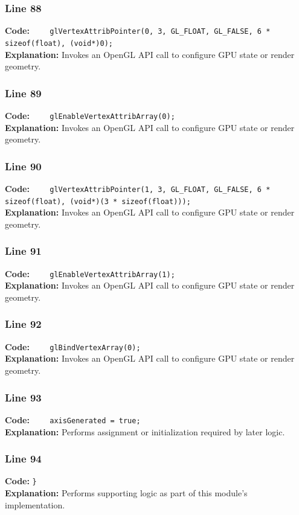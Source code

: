 \documentclass[11pt,a4paper]{article}
\begin{document}
\subsubsection*{Line 88}
\textbf{Code:} \verb|    glVertexAttribPointer(0, 3, GL_FLOAT, GL_FALSE, 6 * sizeof(float), (void*)0);|\\
\textbf{Explanation:} Invokes an OpenGL API call to configure GPU state or render geometry.

\subsubsection*{Line 89}
\textbf{Code:} \verb|    glEnableVertexAttribArray(0);|\\
\textbf{Explanation:} Invokes an OpenGL API call to configure GPU state or render geometry.

\subsubsection*{Line 90}
\textbf{Code:} \verb|    glVertexAttribPointer(1, 3, GL_FLOAT, GL_FALSE, 6 * sizeof(float), (void*)(3 * sizeof(float)));|\\
\textbf{Explanation:} Invokes an OpenGL API call to configure GPU state or render geometry.

\subsubsection*{Line 91}
\textbf{Code:} \verb|    glEnableVertexAttribArray(1);|\\
\textbf{Explanation:} Invokes an OpenGL API call to configure GPU state or render geometry.

\subsubsection*{Line 92}
\textbf{Code:} \verb|    glBindVertexArray(0);|\\
\textbf{Explanation:} Invokes an OpenGL API call to configure GPU state or render geometry.

\subsubsection*{Line 93}
\textbf{Code:} \verb|    axisGenerated = true;|\\
\textbf{Explanation:} Performs assignment or initialization required by later logic.

\subsubsection*{Line 94}
\textbf{Code:} \verb|}|\\
\textbf{Explanation:} Performs supporting logic as part of this module's implementation.
\end{document}
